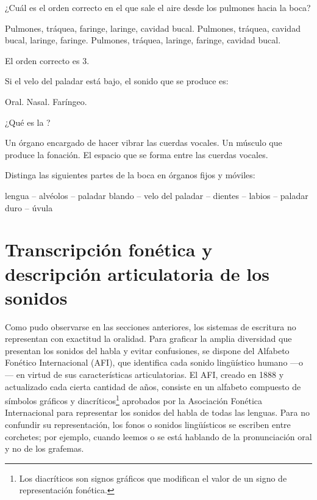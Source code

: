 \begin{ejercicio}\label{ej:03-aparato}
\begin{consignas}
  \item ¿Cuál es el orden correcto en el que sale el aire desde los pulmones
        hacia la boca?
        \begin{exe}
          \ex Pulmones, tráquea, faringe, laringe, cavidad bucal.
          \ex Pulmones, tráquea, cavidad bucal, laringe, faringe.
          \ex Pulmones, tráquea, laringe, faringe, cavidad bucal.
        \end{exe}
        \begin{resuelto}
        El orden correcto es 3.
        \end{resuelto}
  \item Si el velo del paladar está bajo, el sonido que se produce es:
        \begin{exe}
          \ex Oral.
          \ex Nasal.
          \ex Faríngeo.
        \end{exe}
  \item ¿Qué es la ?
        \begin{exe}
          \ex Un órgano encargado de hacer vibrar las cuerdas vocales.
          \ex Un músculo que produce la fonación.
          \ex El espacio que se forma entre las cuerdas vocales.
        \end{exe}
  \item Distinga las siguientes partes de la boca en órganos fijos y móviles:

        lengua -- alvéolos -- paladar blando -- velo del paladar -- dientes --
        labios -- paladar duro -- úvula
\end{consignas}
\end{ejercicio}

\section{Transcripción fonética y descripción articulatoria de los sonidos}\label{sec:03-transcripcion}

Como pudo observarse en las secciones anteriores, los sistemas de escritura no
representan con exactitud la oralidad. Para graficar la amplia diversidad que
presentan los sonidos del habla y evitar confusiones, se dispone del Alfabeto
Fonético Internacional (AFI), que identifica cada sonido lingüístico humano ---o
--- en virtud de sus características articulatorias. El AFI, creado
en 1888 y actualizado cada cierta cantidad de años, consiste en un alfabeto
compuesto de símbolos gráficos y diacríticos\footnote{Los diacríticos son signos
gráficos que modifican el valor de un signo de representación fonética.}
aprobados por la Asociación Fonética Internacional para representar los sonidos
del habla de todas las lenguas. Para no confundir su representación, los fonos o
sonidos lingüísticos se escriben entre corchetes; por ejemplo, cuando leemos
 o  se está hablando de la pronunciación oral y no de los
grafemas.

